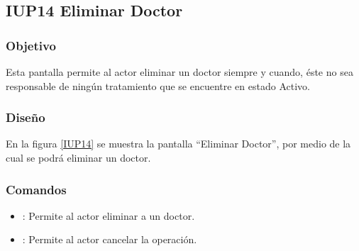 \subsection{IUP14 Eliminar Doctor}
 
\subsubsection{Objetivo}

    Esta pantalla permite al actor eliminar un doctor siempre y cuando, éste no sea responsable de ningún tratamiento que se encuentre en estado Activo.
\subsubsection{Diseño}

    En la figura \ref{IUP14} se muestra la pantalla ``Eliminar Doctor'', por medio de la cual se podrá eliminar un doctor. \\


\subsubsection{Comandos}
\begin{itemize}
    \item {}: Permite al actor eliminar a un doctor.
    \item {}: Permite al actor cancelar la operación.
   
\end{itemize}

%
